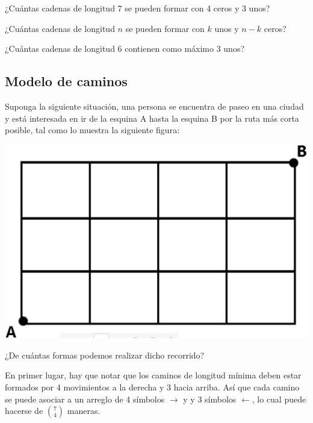 \documentclass[12pt]{article}
\begin{document}
\begin{problema}
    ¿Cuántas cadenas de longitud 7 se pueden formar con 4 ceros y 3 unos?
\end{problema}

\begin{problema}
    ¿Cuántas cadenas de longitud $n$ se pueden formar con $k$ unos y $n-k$ ceros?
\end{problema}

\begin{problema}
    ¿Cuántas cadenas de longitud 6 contienen como máximo 3 unos?
\end{problema}

\newpage

\subsection{Modelo de caminos}

Suponga  la  siguiente  situación,  una  persona se encuentra de paseo en una ciudad y está interesada en ir de la esquina A hasta la esquina B por la ruta más corta posible, tal como lo muestra la siguiente figura:

\begin{center}
    \includegraphics[scale=0.4]{Imagenes/IMG3/Caminos1.png}
\end{center}

¿De cuántas formas podemos realizar dicho recorrido?

En primer lugar, hay que notar que los caminos de longitud mínima deben estar formados por 4 movimientos a la derecha y 3 hacia arriba. Así que cada camino se puede asociar a un arreglo de 4 símbolos $\rightarrow$ y y 3 símbolos $\leftarrow$, lo cual puede hacerse de $\binom{7}{4}$ maneras. 
\end{document}
